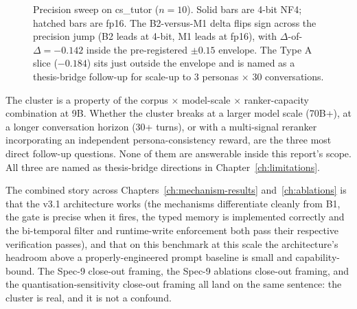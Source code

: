 \begin{figure}[H]
  \centering
  \caption{Precision sweep on cs\_tutor ($n = 10$). Solid bars are 4-bit NF4; hatched bars are fp16. The B2-versus-M1 delta flips sign across the precision jump (B2 leads at 4-bit, M1 leads at fp16), with $\Delta$-of-$\Delta = -0.142$ inside the pre-registered $\pm 0.15$ envelope. The Type A slice ($-0.184$) sits just outside the envelope and is named as a thesis-bridge follow-up for scale-up to 3 personas $\times$ 30 conversations.}
  \label{fig:precision-sweep-bars}
\end{figure}

The cluster is a property of the corpus $\times$ model-scale $\times$ ranker-capacity combination at 9B. Whether the cluster breaks at a larger model scale (70B+), at a longer conversation horizon (30+ turns), or with a multi-signal reranker incorporating an independent persona-consistency reward, are the three most direct follow-up questions. None of them are answerable inside this report's scope. All three are named as thesis-bridge directions in Chapter~\ref{ch:limitations}.

The combined story across Chapters~\ref{ch:mechanism-results} and~\ref{ch:ablations} is that the v3.1 architecture works (the mechanisms differentiate cleanly from B1, the gate is precise when it fires, the typed memory is implemented correctly and the bi-temporal filter and runtime-write enforcement both pass their respective verification passes), and that on this benchmark at this scale the architecture's headroom above a properly-engineered prompt baseline is small and capability-bound. The Spec-9 close-out framing, the Spec-9 ablations close-out framing, and the quantisation-sensitivity close-out framing all land on the same sentence: the cluster is real, and it is not a confound.
